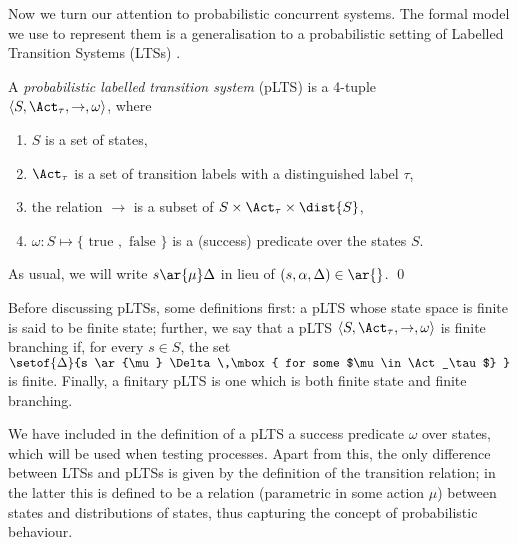 \documentclass{LMCS}
\begin{document}
\noindent Now we turn our attention to probabilistic concurrent systems. The
formal model we  use to represent them is a 
generalisation to a probabilistic setting of 
Labelled Transition Systems (LTSs) \cite{milner}.
\begin{defi}\rm
A \emph{probabilistic labelled transition system} (pLTS) is a 4-tuple\\
$\langle S, \Act_\tau, \rightarrow, \omega \rangle$, where
\begin{enumerate}[label=(\roman*)] \item $S$ is a set of states,
\item $\Act_\tau$ is a set of transition labels with a distinguished label $\tau$,
\item the relation $\rightarrow$ is a subset of $S \times \Act_\tau \times \dist{S}$,
\item $\omega: S \mapsto \{\mbox{ true },\mbox{ false }\}$ is a (success) predicate over the states $S$. 
\end{enumerate}
As usual, we will write $s \ar{\mu} \Delta$ in lieu of $(s,\alpha,\Delta) \in \ar{}$.
\qed
\end{defi}\enlargethispage{9 pt}
Before discussing pLTSs, some definitions first: a pLTS whose state space is finite is said to 
be finite state; further, we say that a pLTS $\langle S, \Act_\tau, \rightarrow, \omega \rangle$ 
is finite branching if, for every $s \in S$, the set 
 $\setof{\Delta}{s \ar{\mu} \Delta \,\mbox{ for some $\mu \in \Act_\tau$}   }$ 
 is finite.
 Finally, a finitary pLTS is one which is both finite 
state and finite branching.

We have included in the definition of a pLTS a success predicate $\omega$ over states, which will
be used when testing processes. Apart from this, the 
only difference between LTSs and pLTSs is given by the definition of the transition relation; 
in the latter this is defined to be a relation (parametric in some action $\mu$) between states 
and distributions of states, thus capturing the concept of probabilistic behaviour. 
\end{document}
